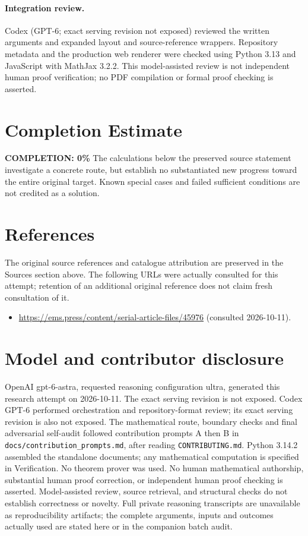 \documentclass[11pt]{article}
\begin{document}
\paragraph{Integration review.} Codex (GPT-6; exact serving revision not exposed) reviewed the written arguments and expanded layout and source-reference wrappers. Repository metadata and the production web renderer were checked using Python 3.13 and JavaScript with MathJax 3.2.2. This model-assisted review is not independent human proof verification; no PDF compilation or formal proof checking is asserted.

\section{Completion Estimate}
\noindent\textbf{COMPLETION: 0\%}
The calculations below the preserved source statement investigate a concrete route,
but establish no substantiated new progress toward the entire original target.
Known special cases and failed sufficient conditions are not credited as a solution.
\section{References}
The original source references and catalogue attribution are preserved in the
Sources section above. The following URLs were actually consulted for this attempt;
retention of an additional original reference does not claim fresh consultation of it.
\begin{itemize}
\item \url{https://ems.press/content/serial-article-files/45976} (consulted 2026-10-11). 
\end{itemize}
\section{Model and contributor disclosure}
OpenAI gpt-6-astra, requested reasoning configuration ultra, generated this research
attempt on 2026-10-11. The exact serving revision is not exposed. Codex GPT-6
performed orchestration and repository-format review; its exact serving revision
is also not exposed. The mathematical route, boundary checks and final adversarial
self-audit followed contribution prompts A then B in
\texttt{docs/contribution\_prompts.md}, after reading \texttt{CONTRIBUTING.md}.
Python 3.14.2 assembled the standalone documents; any mathematical computation is
specified in Verification. No theorem prover was used. No human mathematical
authorship, substantial human proof correction, or independent human proof checking
is asserted. Model-assisted review, source retrieval, and structural checks do not
establish correctness or novelty. Full private reasoning transcripts are unavailable
as reproducibility artifacts; the complete arguments, inputs and outcomes actually
used are stated here or in the companion batch audit.
\end{document}

